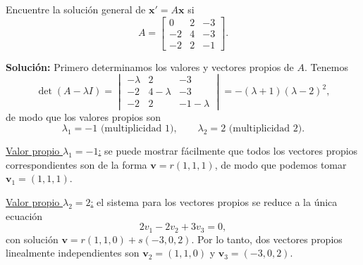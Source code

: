 \begin{example}
Encuentre la soluci\'on general de $\mathbf{x}' = A\mathbf{x}$ si
\[
A = \begin{bmatrix} 0 & 2 & -3 \\ -2 & 4 & -3 \\ -2 & 2 & -1 \end{bmatrix}.
\]

\noindent\textbf{Soluci\'on:} Primero determinamos los valores y vectores propios de $A$. Tenemos
\[
\det(A - \lambda I) = \begin{vmatrix} -\lambda & 2 & -3 \\ -2 & 4 - \lambda & -3 \\ -2 & 2 & -1 - \lambda \end{vmatrix} = -(\lambda + 1)(\lambda - 2)^2,
\]
de modo que los valores propios son
\[
\lambda_1 = -1 \text{ (multiplicidad 1)}, \qquad \lambda_2 = 2 \text{ (multiplicidad 2)}.
\]

\medskip
\noindent \underline{Valor propio $\lambda_1 = -1$:} se puede mostrar f\'acilmente que todos los vectores propios correspondientes son de la forma $\mathbf{v} = r(1, 1, 1)$, de modo que podemos tomar $\mathbf{v}_1 = (1, 1, 1)$.

\medskip
\noindent \underline{Valor propio $\lambda_2 = 2$:} el sistema para los vectores propios se reduce a la \'unica ecuaci\'on
\[
2v_1 - 2v_2 + 3v_3 = 0,
\]
con soluci\'on $\mathbf{v} = r(1, 1, 0) + s(-3, 0, 2)$. Por lo tanto, dos vectores propios linealmente independientes son $\mathbf{v}_2 = (1, 1, 0)$ y $\mathbf{v}_3 = (-3, 0, 2)$.


\end{example}
